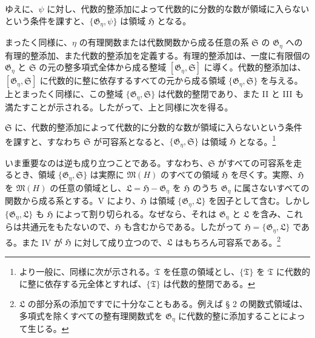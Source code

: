 \documentclass[11pt]{article}
\begin{document}
ゆえに、$\psi$ に対し、代数的整添加によって代数的に分数的な数が領域に入らないという条件を課すと、$\{\mathfrak G_\eta,\psi\}$ は領域 $\mathfrak H$ となる。

まったく同様に、$\eta$ の有理関数または代数関数から成る任意の系 $\mathfrak S$ の $\mathfrak G_\eta$ への有理的整添加、また代数的整添加を定義する。有理的整添加は、一度に有限個の $\mathfrak G_\eta$ と $\mathfrak S$ の元の整多項式全体から成る整域 $[\mathfrak G_\eta,\mathfrak S]$ に導く。代数的整添加は、$[\mathfrak G_\eta,\mathfrak S]$ に代数的に整に依存するすべての元から成る領域 $\{\mathfrak G_\eta,\mathfrak S\}$ を与える。上とまったく同様に、この整域 $\{\mathfrak G_\eta,\mathfrak S\}$ は代数的整閉であり、また II と III も満たすことが示される。したがって、上と同様に次を得る。

$\mathfrak S$ に、代数的整添加によって代数的に分数的な数が領域に入らないという条件を課すと、すなわち $\mathfrak S$ が可容系となると、$\{\mathfrak G_\eta,\mathfrak S\}$ は領域 $\mathfrak H$ となる。\footnote{より一般に、同様に次が示される。$\mathfrak T$ を任意の領域とし、$\{\mathfrak T\}$ を $\mathfrak T$ に代数的に整に依存する元全体とすれば、$\{\mathfrak T\}$ は代数的整閉である。}

いま重要なのは逆も成り立つことである。すなわち、$\mathfrak S$ がすべての可容系を走るとき、領域 $\{\mathfrak G_\eta,\mathfrak S\}$ は実際に $\mathfrak M(H)$ のすべての領域 $\mathfrak H$ を尽くす。実際、$\mathfrak H$ を $\mathfrak M(H)$ の任意の領域とし、$\mathfrak L=\mathfrak H-\mathfrak G_\eta$ を $\mathfrak H$ のうち $\mathfrak G_\eta$ に属さないすべての関数から成る系とする。V により、$\mathfrak H$ は領域 $\{\mathfrak G_\eta,\mathfrak L\}$ を因子として含む。しかし $\{\mathfrak G_\eta,\mathfrak L\}$ も $\mathfrak H$ によって割り切られる。なぜなら、それは $\mathfrak G_\eta$ と $\mathfrak L$ を含み、これらは共通元をもたないので、$\mathfrak H$ も含むからである。したがって $\mathfrak H=\{\mathfrak G_\eta,\mathfrak L\}$ である。また IV が $\mathfrak H$ に対して成り立つので、$\mathfrak L$ はもちろん可容系である。\footnote{$\mathfrak L$ の部分系の添加ですでに十分なこともある。例えば § 2 の関数式領域は、多項式を除くすべての整有理関数式を $\mathfrak G_\eta$ に代数的整に添加することによって生じる。}
\end{document}
